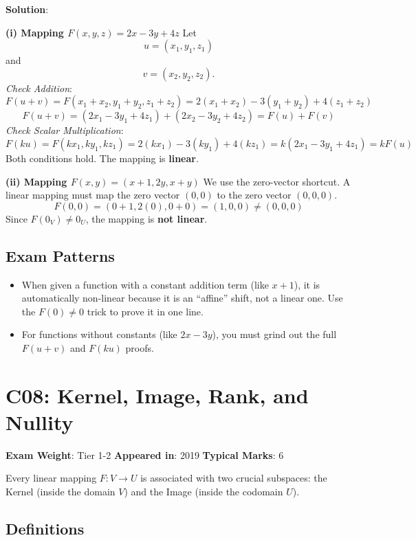 \documentclass[
]{article}
\providecommand{\tightlist}{%
  \setlength{\itemsep}{0pt}\setlength{\parskip}{0pt}}
\renewenvironment{quote}
  {\begin{tcolorbox}[
     colback=calloutbg,
     colframe=calloutframe,
     colupper=callouttext,
     arc=3pt,
     boxrule=0.5pt,
     leftrule=0.5pt,
     borderline west={3pt}{0pt}{calloutaccent},
     left=8pt,
     right=8pt,
     top=6pt,
     bottom=6pt
   ]}
  {\end{tcolorbox}}
\begin{document}
\textbf{Solution}:

\textbf{(i) Mapping \(F(x, y, z) = 2x - 3y + 4z\)} Let
\[
u = (x_1, y_1, z_1)
\]
and
\[
v = (x_2, y_2, z_2).
\]
\emph{Check Addition}:
\[
F(u + v) = F(x_1 + x_2, y_1 + y_2, z_1 + z_2) = 2(x_1 + x_2) - 3(y_1 + y_2) + 4(z_1 + z_2)
\]
\[
F(u + v) = (2x_1 - 3y_1 + 4z_1) + (2x_2 - 3y_2 + 4z_2) = F(u) + F(v)
\]
\emph{Check Scalar Multiplication}:
\[
F(ku) = F(kx_1, ky_1, kz_1) = 2(kx_1) - 3(ky_1) + 4(kz_1) = k(2x_1 - 3y_1 + 4z_1) = kF(u)
\]
Both conditions hold. The mapping is \textbf{linear}.

\textbf{(ii) Mapping \(F(x, y) = (x+1, 2y, x+y)\)} We use the
zero-vector shortcut. A linear mapping must map the zero vector
\((0,0)\) to the zero vector \((0,0,0)\).
\[
F(0, 0) = (0 + 1, 2(0), 0 + 0) = (1, 0, 0) \neq (0, 0, 0)
\]
Since \(F(0_V) \neq 0_U\), the mapping is \textbf{not linear}.

\subsection{Exam Patterns}\label{exam-patterns-35}

\begin{itemize}
\tightlist
\item
  When given a function with a constant addition term (like \(x+1\)), it
  is automatically non-linear because it is an ``affine'' shift, not a
  linear one. Use the \(F(0) \neq 0\) trick to prove it in one line.
\item
  For functions without constants (like \(2x-3y\)), you must grind out
  the full \(F(u+v)\) and \(F(ku)\) proofs.
\end{itemize}

\section{C08: Kernel, Image, Rank, and
Nullity}\label{c08-kernel-image-rank-and-nullity}

\begin{quote}
\textbf{Exam Weight}: Tier 1-2 \textbar{} \textbf{Appeared in}: 2019
\textbar{} \textbf{Typical Marks}: 6
\end{quote}

Every linear mapping \(F: V \to U\) is associated with two crucial
subspaces: the Kernel (inside the domain \(V\)) and the Image (inside
the codomain \(U\)).

\subsection{Definitions}\label{definitions-2}
\end{document}
